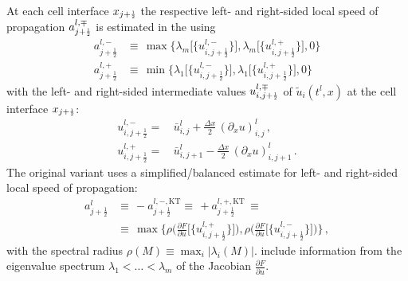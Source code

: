 \begin{enumerate}[label=\textbf{\arabic*}.]
	At each cell interface $x_{j + \ttfrac{1}{2}}$ the respective left- and right-sided local speed of propagation $a_{j + \ttfrac{1}{2}}^{l, \mp}$ is estimated in the \knpScheme{} using
	\begin{subequations}\label{eq:FVampjp12}
	\begin{align}
		a_{j + \frac{1}{2}}^{l,-} &\equiv\,\max\bigg\{\lambda_m\Big[\Big\{ u_{i,j + \frac{1}{2}}^{l,-}\Big\} \Big],\lambda_m\Big[\Big\{ u_{i,j + \frac{1}{2}}^{l,+}\Big\} \Big], 0\bigg\}\label{eq:FVamjp12} \\[0.1em]
		a_{j + \frac{1}{2}}^{l,+} &\equiv\,\min\bigg\{\lambda_1\Big[\Big\{ u_{i,j + \frac{1}{2}}^{l,-}\Big\} \Big],\lambda_1\Big[\Big\{ u_{i,j + \frac{1}{2}}^{l,+}\Big\} \Big], 0\bigg\}\label{eq:FVapjp12}
	\end{align}
	\end{subequations}
	with the left- and right-sided intermediate values $u_{i,j + \ttfrac{1}{2}}^{l, \mp}$ of $\tilde{u}_i ( t^l, x )$ at the cell interface $x_{j + \ttfrac{1}{2}}$:
	\begin{subequations}\label{eq:FVumpjp12}
	\begin{align}
		u_{i,j + \frac{1}{2}}^{l,-} = \, & \bar{u}_{i,j}^l + \tfrac{\Delta x}{2} \, ( \partial_x u )_{i,j}^l \, ,	\label{eq:FVumjp12}\\[0.1em]
		u_{i,j + \frac{1}{2}}^{l,+} = \, & \bar{u}_{i,j+1}^l -\tfrac{\Delta x}{2}  \, ( \partial_x u )_{i,j+1}^l \, . \label{eq:FVupjp12}
	\end{align}
	\end{subequations}
	The original \kt{} variant uses a simplified/balanced estimate for left- and right-sided local speed of propagation:
	\begin{subequations}\label{eq:FVajp12}
	\begin{align}
		a_{j + \frac{1}{2}}^{l} &\equiv\, -a_{j + \frac{1}{2}}^{l, -,\mathrm{KT}}\equiv\, +a_{j + \frac{1}{2}}^{l, +,\mathrm{KT}}\,\equiv \label{eq:FVajpmKT}\\
		&\equiv\, \max \bigg\{ \rho\bigg( \frac{\partial F}{\partial u} \Big[\Big\{ u_{i,j + \frac{1}{2}}^{l,+}\Big\} \Big] \bigg) , \rho\bigg( \frac{\partial F}{\partial u} \Big[\Big\{ u_{i,j + \frac{1}{2}}^{l,-}\Big\} \Big] \bigg) \bigg\}\, ,
	\end{align}
	\end{subequations}
	with the spectral radius $\rho ( M ) \equiv \max_i | \lambda_i ( M ) |$.
	 include information from the eigenvalue spectrum $\lambda_1 < \ldots < \lambda_m$ of the Jacobian $\frac{\partial F}{\partial u}$.

\end{enumerate}
